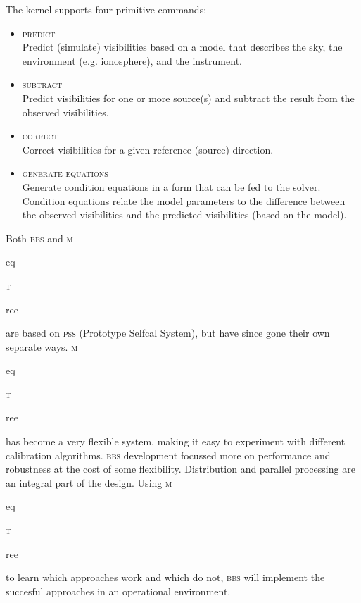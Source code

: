 \documentclass[10pt]{lofar}
\newcommand{\bbs}{\textsc{bbs}\xspace}
\newcommand{\meqtree}{\textsc{m}\begin{footnotesize}eq\end{footnotesize}\textsc{t}\begin{footnotesize}ree\end{footnotesize}\xspace}
\begin{document}
The kernel supports four primitive commands:
\begin{itemize}
\item \textsc{predict}\\
Predict (simulate) visibilities based on a model that describes the sky, the
environment (e.g. ionosphere), and the instrument.
\item \textsc{subtract}\\
Predict visibilities for one or more source(s) and subtract the result from the
observed visibilities.
\item \textsc{correct}\\
Correct visibilities for a given reference (source) direction.
\item \textsc{generate equations}\\
Generate condition equations in a form that can be fed to the solver. Condition
equations relate the model parameters to the difference between the observed
visibilities and the predicted visibilities (based on the model).
\end{itemize}


Both \bbs and \meqtree are based on \textsc{pss} (Prototype Selfcal System), but
have since gone their own separate ways. \meqtree has become a very flexible
system, making it easy to experiment with different calibration algorithms. \bbs
development focussed more on performance and robustness at the cost of some
flexibility. Distribution and parallel processing are an integral part of the
design. Using \meqtree to learn which approaches work and which do not, \bbs
will implement the succesful approaches in an operational environment.
\end{document}
